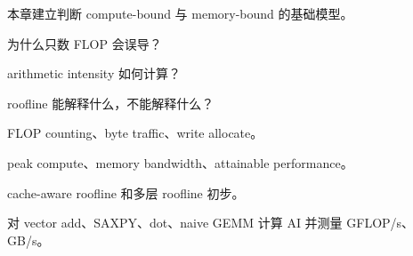 {本章建立判断 compute-bound 与 memory-bound 的基础模型。}
{\item 为什么只数 FLOP 会误导？
\item arithmetic intensity 如何计算？
\item roofline 能解释什么，不能解释什么？}
{\item FLOP counting、byte traffic、write allocate。
\item peak compute、memory bandwidth、attainable performance。
\item cache-aware roofline 和多层 roofline 初步。}
{对 vector add、SAXPY、dot、naive GEMM 计算 AI 并测量 GFLOP/s、GB/s。}
